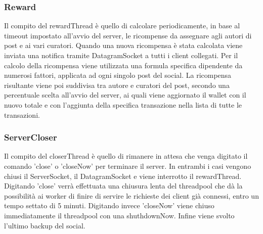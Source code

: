 \documentclass[11pt, a4paper, oneside]{article}
\begin{document}
\subsubsection{Reward}
Il compito del rewardThread è quello di calcolare periodicamente, in base al timeout impostato all'avvio del server, le ricompense da assegnare agli autori 
di post e ai vari curatori. Quando una nuova ricompensa è stata calcolata viene inviata una notifica tramite DatagramSocket a tutti i client collegati.  
Per il calcolo della ricompensa viene utilizzata una formula specifica dipendente da numerosi fattori, applicata ad ogni singolo post del social. La ricompensa
risultante viene poi suddivisa tra autore e curatori del post, secondo una percentuale scelta all'avvio del server, ai quali viene aggiornato il wallet con il nuovo 
totale e con l'aggiunta della specifica transazione nella lista di tutte le transazioni.
\subsubsection{ServerCloser}
Il compito del closerThread è quello di rimanere in attesa che venga digitato il comando 'close' o 'closeNow' per terminare il server.
In entrambi i casi vengono chiusi il ServerSocket, il DatagramSocket e viene interrotto il rewardThread.
Digitando 'close' verrà effettuata una chiusura lenta del threadpool che dà la possibilità ai worker di finire di servire le richieste dei client già connessi, entro 
un tempo settato di 5 minuti. Digitando invece 'closeNow' viene chiuso immediatamente il threadpool con una shuthdownNow. Infine viene svolto l'ultimo backup del social.
\end{document}
